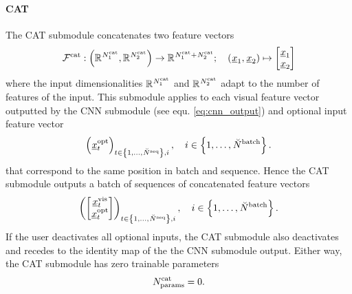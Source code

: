 \paragraph*{CAT} ${}$\\
The CAT submodule concatenates
two feature vectors
\begin{align} \label{eq:cat}
    \CATMap
    :
    \tuple{\R{\CATInp{1}}, \R{\CATInp{2}}}
    \rightarrow 
    \R{\CATInp{1} + \CATInp{2}}
    ;\quad
    \tuple{\featvec[]{}{1}{}{}, \featvec[]{}{2}{}{}}
    \mapsto
    \begin{bmatrix}
        \featvec[]{}{1}{}{} \\ \featvec[]{}{2}{}{}
    \end{bmatrix}
\end{align}
where the input dimensionalities
$\mathbb{R}^{\num[]{\cat}{1}{}{}}$
and
$\mathbb{R}^{\num[]{\cat}{2}{}{}}$
adapt to the number of features of the input.
This submodule applies to each
visual feature vector 
outputted by the CNN submodule 
(see equ. \ref{eq:cnn_output})
and optional input feature vector
\begin{equation} \label{eq:batch_opt}
    \series{\optFeatVec{t}}_{t \in \setOfInts{1, \dots, \seqLen}, i}
    ,\quad 
    i \in \setOfInts{1, \dots, \batchSize}.
\end{equation}
that correspond to the same position in batch and sequence.
Hence the CAT submodule outputs a batch of sequences
of concatenated feature vectors
\begin{equation} \label{eq:cat_output}
    \series{
        \begin{bmatrix} 
            \visFeatVec{t} \\ \optFeatVec{t}
        \end{bmatrix}
    }_{t \in \setOfInts{1, \dots, \seqLen}, i}
    ,\quad 
    i \in \setOfInts{1, \dots, \batchSize}.
\end{equation}
If the user deactivates all optional inputs,
the CAT submodule also deactivates and recedes to 
the identity map of the the CNN submodule output.
Either way, the CAT submodule has zero trainable parameters
\begin{equation}
    \CATNumP = 0.
\end{equation}




\newcommand{\GRULayerMap}[1]{\Func[]{\gru}{#1}{}{}}
\newcommand{\GRUNumLayer}{\num[\user]{\gru}{\layer}{}{}}
\newcommand{\GRUInp}[1]{\num[]{\gru}{\inp,#1}{}{}}
\newcommand{\GRUHiddenSize}{\num[\user]{\gru}{\hidden}{}{}}

